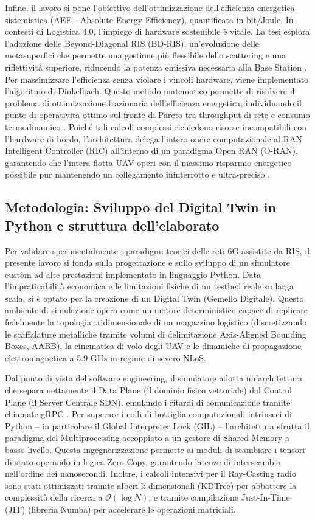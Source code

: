 \documentclass[twoside]{article}
\begin{document}
Infine, il lavoro si pone l'obiettivo dell'ottimizzazione dell'efficienza energetica sistemistica (AEE - Absolute Energy Efficiency), quantificata in bit/Joule. In contesti di Logistica 4.0, l'impiego di hardware sostenibile è vitale. La tesi esplora l'adozione delle Beyond-Diagonal RIS (BD-RIS), un'evoluzione delle metasuperfici che permette una gestione più flessibile dello scattering e una riflettività superiore, riducendo la potenza emissiva necessaria alla Base Station \cite{Khan2024}. Per massimizzare l'efficienza senza violare i vincoli hardware, viene implementato l'algoritmo di Dinkelbach. Questo metodo matematico permette di risolvere il problema di ottimizzazione frazionaria dell'efficienza energetica, individuando il punto di operatività ottimo sul fronte di Pareto tra throughput di rete e consumo termodinamico \cite{Khan2024}. Poiché tali calcoli complessi richiedono risorse incompatibili con l'hardware di bordo, l'architettura delega l'intero onere computazionale al RAN Intelligent Controller (RIC) all'interno di un paradigma Open RAN (O-RAN), garantendo che l'intera flotta UAV operi con il massimo risparmio energetico possibile pur mantenendo un collegamento ininterrotto e ultra-preciso \cite{Lien2024}.

\subsection{Metodologia: Sviluppo del Digital Twin in Python e struttura dell'elaborato}

Per validare sperimentalmente i paradigmi teorici delle reti 6G assistite da RIS, il presente lavoro si fonda sulla progettazione e sullo sviluppo di un simulatore custom ad alte prestazioni implementato in linguaggio Python. Data l'impraticabilità economica e le limitazioni fisiche di un testbed reale su larga scala, si è optato per la creazione di un Digital Twin (Gemello Digitale). Questo ambiente di simulazione opera come un motore deterministico capace di replicare fedelmente la topologia tridimensionale di un magazzino logistico (discretizzando le scaffalature metalliche tramite volumi di delimitazione Axis-Aligned Bounding Boxes, AABB), la cinematica di volo degli UAV e le dinamiche di propagazione elettromagnetica a 5.9 GHz in regime di severo NLoS.

Dal punto di vista del software engineering, il simulatore adotta un'architettura che separa nettamente il Data Plane (il dominio fisico vettoriale) dal Control Plane (il Server Centrale SDN), emulando i ritardi di comunicazione tramite chiamate gRPC \cite{Vairam2023}. Per superare i colli di bottiglia computazionali intrinseci di Python -- in particolare il Global Interpreter Lock (GIL) -- l'architettura sfrutta il paradigma del Multiprocessing accoppiato a un gestore di Shared Memory a basso livello. Questa ingegnerizzazione permette ai moduli di scambiare i tensori di stato operando in logica Zero-Copy, garantendo latenze di interscambio nell'ordine dei nanosecondi. Inoltre, i calcoli intensivi per il Ray-Casting radio sono stati ottimizzati tramite alberi k-dimensionali (KDTree) per abbattere la complessità della ricerca a $\mathcal{O}(\log N)$, e tramite compilazione Just-In-Time (JIT) (libreria Numba) per accelerare le operazioni matriciali.
\end{document}
